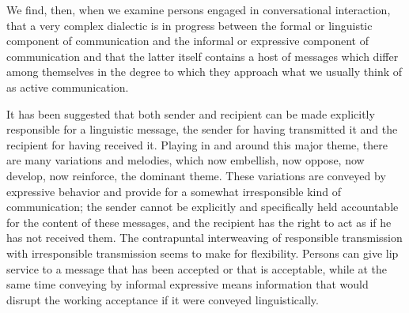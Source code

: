 \documentclass[openany,nobib]{tufte-book}
\begin{document}
We find, then, when we examine persons engaged in con­versational
interaction, that a very complex dialectic is in progress between the
formal or linguistic component of communication and the informal or
expressive component of communication and that the latter itself
contains a host of messages which differ among themselves in the degree
to which they approach what we usually think of as active communication.

\newpage It has been suggested that both sender and recipient can be made
explicitly responsible for a linguistic message, the sender for having
transmitted it and the recipient for having received it. Playing in and
around this major theme, there are many variations and melodies, which
now embellish, now oppose, now develop, now reinforce, the dominant
theme. These varia­tions are conveyed by expressive behavior and provide
for a some­what irresponsible kind of communication; the sender cannot be
explicitly and specifically held accountable for the content of these
messages, and the recipient has the right to act as if he has not
received them. The contrapuntal interweaving of responsible transmission
with irresponsible transmission seems to make for flexibility. Persons
can give lip service to a message that has been accepted or that is
acceptable, while at the same time conveying by informal expressive
means information that would disrupt the working acceptance if it were
conveyed lin­guistically.
\end{document}

